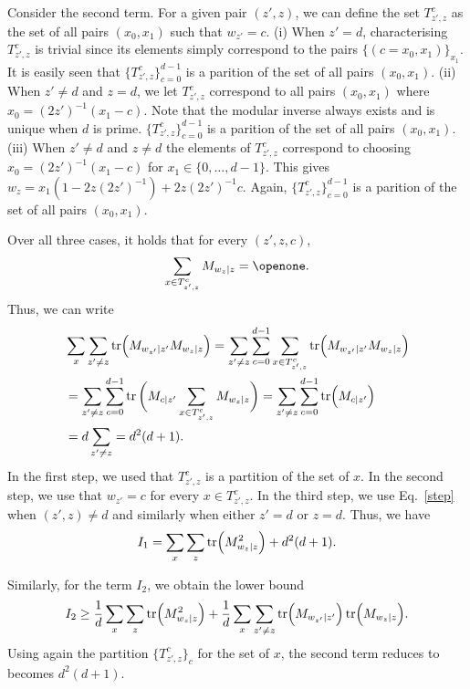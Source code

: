 \documentclass[aps,superscriptaddress,twocolumn,twoside,floatfix,pra,nofootinbib,a4paper]{revtex4-2}
\begin{document}
Consider the second term. For a given pair $(z',z)$, we can define the set $T_{z',z}^c$ as the set of all pairs $(x_0,x_1)$ such that $w_{z'}=c$. (i) When  $z'=d$, characterising $T_{z',z}^c$ is trivial since its elements simply correspond to the pairs $\{(c=x_0,x_1)\}_{x_1}$. It is easily seen that $\{T_{z',z}^c\}_{c=0}^{d-1}$ is a parition of the set of all pairs $(x_0,x_1)$. (ii) When $z'\neq d$ and $z=d$, we let $T_{z',z}^c$ correspond to all pairs $(x_0,x_1)$ where $x_0=(2z')^{-1}(x_1-c)$. Note that the modular inverse always exists and is unique when $d$ is prime.  $\{T_{z',z}^c\}_{c=0}^{d-1}$ is a parition of the set of all pairs $(x_0,x_1)$. (iii) When $z'\neq d$ and $z\neq d$ the elements of $T_{z',z}^c$ correspond to choosing $x_0=(2z')^{-1}(x_1-c)$ for $x_1\in\{0,\ldots,d-1\}$. This  gives $w_z=x_1\left(1-2z(2z')^{-1}\right)+2z(2z')^{-1}c$. Again, $\{T_{z',z}^c\}_{c=0}^{d-1}$ is a parition of the set of all pairs $(x_0,x_1)$. 

Over all three cases, it holds that  for every $(z',z,c)$,
\begin{equation}\label{step}
\sum_{x\in T_{z',z}^c} M_{w_z|z}=\openone.
\end{equation}
Thus, we can write
\begin{align}\nonumber
&\sum_x \sum_{z'\neq z} \tr(M_{w_{z'}|z'}M_{w_z|z})=\sum_{z'\neq z}\sum_{c=0}^{d-1} \sum_{x\in T_{z',z}^c} \tr(M_{w_{z'}|z'}M_{w_z|z})\\ \nonumber
& =\sum_{z'\neq z}\sum_{c=0}^{d-1}  \tr\bigg(M_{c|z'}\sum_{x\in T_{z',z}^c} M_{w_z|z}\bigg)=\sum_{z'\neq z}\sum_{c=0}^{d-1}  \tr(M_{c|z'})\\ 
&=d \sum_{z'\neq z}=d^2(d+1).
\end{align}
In the first step, we used that $T_{z',z}^{c}$ is a partition of the set of $x$. In the second step, we use that $w_{z'}=c$ for every $x\in T_{z',z}^{c}$. In the third step, we use Eq.~\eqref{step} when $(z',z)\neq d$ and similarly when either $z'=d$ or $z=d$. Thus, we have
\begin{equation}
I_1=\sum_x \sum_{z} \tr(M_{w_z|z}^2)+d^2(d+1).
\end{equation}

Similarly, for the term $I_2$, we obtain the lower bound
\begin{align}
I_2\geq \frac{1}{d}\sum_x \sum_{z}\tr(M_{w_z|z}^2)+\frac{1}{d}\sum_x \sum_{z'\neq z}\tr(M_{w_{z'}|z'})\tr(M_{w_z|z}).
\end{align}
Using again the partition $\{T_{z',z}^c\}_c$ for the set of $x$, the second term reduces to becomes $d^2(d+1)$.
\end{document}
